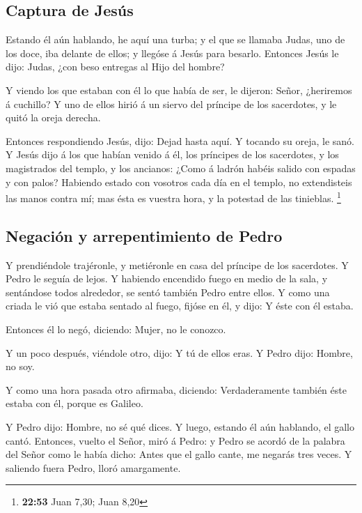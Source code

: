 \hypertarget{captura-de-jesuxfas}{%
\subsection{Captura de Jesús}\label{captura-de-jesuxfas}}

 Estando él aún hablando, he aquí una turba; y el que se
llamaba Judas, uno de los doce, iba delante de ellos; y llegóse á Jesús
para besarlo.  Entonces Jesús le dijo: Judas, ¿con beso
entregas al Hijo del hombre?

 Y viendo los que estaban con él lo que había de ser, le
dijeron: Señor, ¿heriremos á cuchillo?  Y uno de ellos
hirió á un siervo del príncipe de los sacerdotes, y le quitó la oreja
derecha.

 Entonces respondiendo Jesús, dijo: Dejad hasta aquí. Y
tocando su oreja, le sanó.  Y Jesús dijo á los que habían
venido á él, los príncipes de los sacerdotes, y los magistrados del
templo, y los ancianos: ¿Como á ladrón habéis salido con espadas y con
palos?  Habiendo estado con vosotros cada día en el
templo, no extendisteis las manos contra mí; mas ésta es vuestra hora, y
la potestad de las tinieblas. \footnote{\textbf{22:53} Juan 7,30; Juan
  8,20}

\hypertarget{negaciuxf3n-y-arrepentimiento-de-pedro}{%
\subsection{Negación y arrepentimiento de
Pedro}\label{negaciuxf3n-y-arrepentimiento-de-pedro}}

 Y prendiéndole trajéronle, y metiéronle en casa del
príncipe de los sacerdotes. Y Pedro le seguía de lejos. 
Y habiendo encendido fuego en medio de la sala, y sentándose todos
alrededor, se sentó también Pedro entre ellos.  Y como
una criada le vió que estaba sentado al fuego, fijóse en él, y dijo: Y
éste con él estaba.

 Entonces él lo negó, diciendo: Mujer, no le conozco.

 Y un poco después, viéndole otro, dijo: Y tú de ellos
eras. Y Pedro dijo: Hombre, no soy.

 Y como una hora pasada otro afirmaba, diciendo:
Verdaderamente también éste estaba con él, porque es Galileo.

 Y Pedro dijo: Hombre, no sé qué dices. Y luego, estando
él aún hablando, el gallo cantó.  Entonces, vuelto el
Señor, miró á Pedro: y Pedro se acordó de la palabra del Señor como le
había dicho: Antes que el gallo cante, me negarás tres veces.
 Y saliendo fuera Pedro, lloró amargamente.

